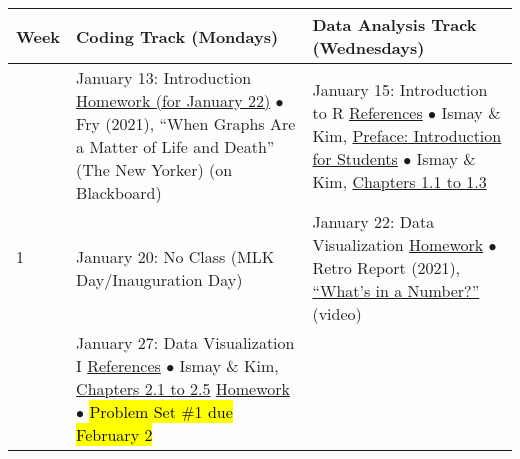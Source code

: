 \documentclass[12pt,letterpaper]{article}
\begin{document}
\begin{tabularx}{\textwidth}{|p{}|p{}||p{}|}
\hline
\textbf{Week} & \textbf{Coding Track (Mondays)} & \textbf{Data Analysis Track (Wednesdays)} \\


\hline
\multirow{6}{*}{1} &

January 13: Introduction \newline \newline
\ul{Homework (for January 22)} \newline
$\bullet$ Fry (2021), ``When Graphs Are a Matter of Life and Death'' (The New Yorker) (on Blackboard) &

January 15: Introduction to R \newline \newline
\ul{References} \newline
$\bullet$ Ismay \& Kim, \href{https://moderndive.com/preface.html\#introduction-for-students}{Preface: Introduction for Students} \newline
$\bullet$ Ismay \& Kim, \href{https://moderndive.com/1-getting-started.html}{Chapters 1.1 to 1.3} \\


\hline
\multirow{5}{*}{2} &

January 20: No Class (MLK Day/Inauguration Day) &

January 22: Data Visualization \newline \newline
\ul{Homework} \newline
$\bullet$ Retro Report (2021), \href{https://www.retroreport.org/video/research-challenges-idea-that-lower-bmi-is-always-better/}{``What's in a Number?''} (video) \\


\hline
\multirow{7}{*}{3} &

January 27: Data Visualization I \newline \newline
\ul{References} \newline
$\bullet$ Ismay \& Kim, \href{https://moderndive.com/2-viz.html}{Chapters 2.1 to 2.5} \newline \newline
\ul{Homework} \newline
$\bullet$ \hl{Problem Set \#1 due February 2} &


\end{tabularx}
\end{document}
